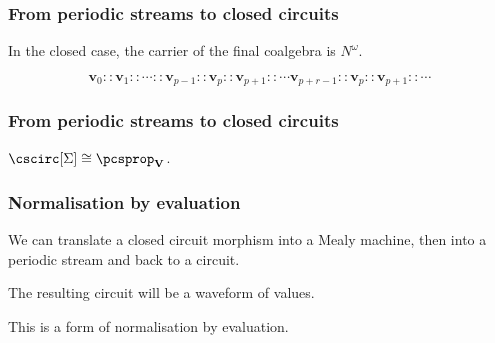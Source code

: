 \begin{frame}
    \frametitle{From periodic streams to closed circuits}

    In the \alert{closed} case, the carrier of the final coalgebra is \(N^\omega\).

    \pause

    \[ \textbf{v}_0 :: \textbf{v}_1 :: \cdots :: \textbf{v}_{p-1} :: \textbf{v}_{p} :: \textbf{v}_{p+1} :: \cdots \textbf{v}_{p+r-1} :: \textbf{v}_{p} :: \textbf{v}_{p+1} :: \cdots\]

    \pause

    \begin{center}
    \end{center}

\end{frame}

\begin{frame}
    \frametitle{From periodic streams to closed circuits}
        \pause

        \begin{center}

            \pause

            \vspace{1em}

        \end{center}
    
        \vspace{1em}

        \pause

        \begin{theorem}
            \(\cscirc[\Sigma] \cong {\pcsprop}_{\textbf{V}}\).
        \end{theorem}
\end{frame}

\begin{frame}
    \frametitle{Normalisation by evaluation}

    \pause

    We can translate a closed circuit morphism into a Mealy machine, then into a periodic stream and back to a circuit.

    \pause

    The resulting circuit will be a \alert{waveform} of values.
    
    \pause

    This is a form of \alert{normalisation by evaluation}.

\end{frame}